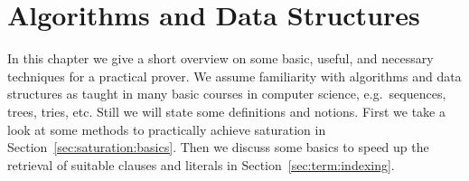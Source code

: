 
\chapter{Algorithms and Data Structures}

In this chapter we give a short overview on some basic, useful, and necessary techniques for a practical prover. We assume familiarity with algorithms and data structures as taught in many basic courses in computer science, e.g.\ sequences, trees, tries, etc. Still we will state some definitions and notions.
First we take a look at some methods to practically achieve saturation in Section~\vref{sec:saturation:basics}.
Then we discuss some basics to speed up the retrieval of
suitable clauses and literals in Section~\vref{sec:term:indexing}.











